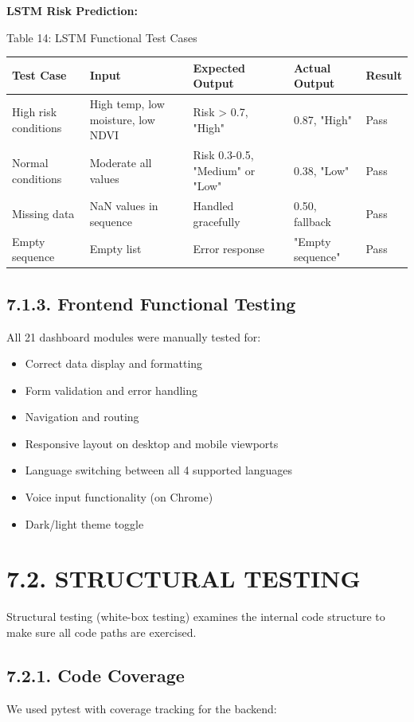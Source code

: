 \documentclass[12pt, a4paper]{report}
\begin{document}
\textbf{LSTM Risk Prediction:}

Table 14: LSTM Functional Test Cases

\begin{table}[htbp]
\centering
\small
\begin{tabularx}{\textwidth}{|X|X|X|X|X|}
\hline
Test Case & Input & Expected Output & Actual Output & Result \\
\hline
High risk conditions & High temp, low moisture, low NDVI & Risk > 0.7, "High" & 0.87, "High" & Pass \\
Normal conditions & Moderate all values & Risk 0.3-0.5, "Medium" or "Low" & 0.38, "Low" & Pass \\
Missing data & NaN values in sequence & Handled gracefully & 0.50, fallback & Pass \\
Empty sequence & Empty list & Error response & "Empty sequence" & Pass \\
\hline
\end{tabularx}
\end{table}

\subsection{7.1.3. Frontend Functional Testing}
All 21 dashboard modules were manually tested for:

\begin{itemize}[leftmargin=*]
  \item Correct data display and formatting
  \item Form validation and error handling
  \item Navigation and routing
  \item Responsive layout on desktop and mobile viewports
  \item Language switching between all 4 supported languages
  \item Voice input functionality (on Chrome)
  \item Dark/light theme toggle
\end{itemize}
\section{7.2. STRUCTURAL TESTING}
Structural testing (white-box testing) examines the internal code structure to make sure all code paths are exercised.

\subsection{7.2.1. Code Coverage}
We used pytest with coverage tracking for the backend:
\end{document}
